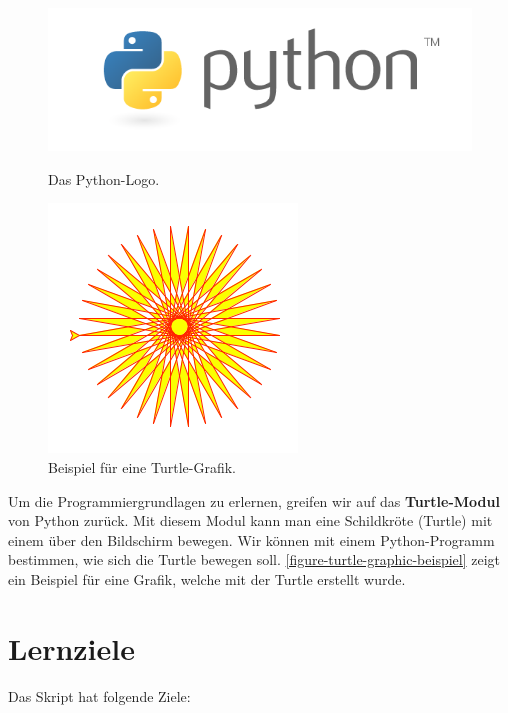 \begin{figure}[htb]
\centering
\begin{minipage}[b][][b]{0.4\textwidth}
\centering 
\includegraphics[scale=0.3]{python-logo}
\caption{Das Python-Logo.}
\label{figure-python-logo}
\end{minipage}
\hfill
\begin{minipage}[b][][b]{0.5\textwidth}
\centering
\includegraphics[scale=0.4]{turtle-star}
\caption{Beispiel für eine Turtle-Grafik.}
\label{figure-turtle-graphic-beispiel}
\end{minipage}
\end{figure}

Um die Programmiergrundlagen zu erlernen, greifen wir auf das \textbf{Turtle-Modul} von Python zurück. Mit diesem Modul kann man eine Schildkröte (Turtle) mit einem  über den Bildschirm bewegen. Wir können mit einem Python-Programm bestimmen, wie sich die Turtle bewegen soll. \autoref{figure-turtle-graphic-beispiel} zeigt ein Beispiel für eine Grafik, welche mit der Turtle erstellt wurde.

\section{Lernziele}

Das Skript hat folgende Ziele:

